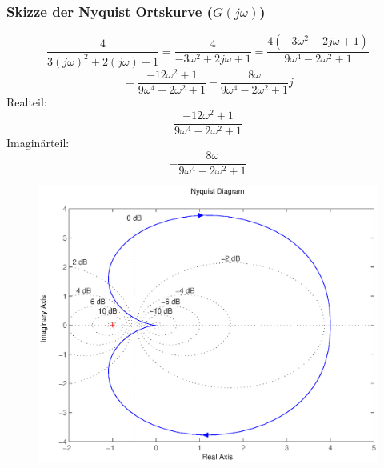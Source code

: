 \documentclass[a4paper,10pt,fleqn]{article}
\begin{document}
\subsubsection*{Skizze der Nyquist Ortskurve ($G(j\omega)$)}
\[ \frac{4}{3(j\omega)^2 + 2(j\omega) + 1} = \frac{4}{-3 \omega^2 + 2 j \omega + 1} 
= \frac{4 (-3 \omega^2 - 2 j \omega + 1)}{9 \omega^4 - 2 \omega^2  + 1} \]
\[ = \frac{-12 \omega^2 + 1}{9 \omega^4 - 2 \omega^2 + 1} - \frac{8 \omega}{9 \omega^4 - 2 \omega^2 + 1}j \]
Realteil: 
\[  \frac{-12 \omega^2 + 1}{9 \omega^4 - 2 \omega^2 + 1} \]
Imaginärteil: 
\[ - \frac{8 \omega}{9 \omega^4 - 2 \omega^2 + 1} \]
\begin{figure}[h!]
\center
\includegraphics[width=\textwidth]{nyquist.eps}
\end{figure}
\end{document}
